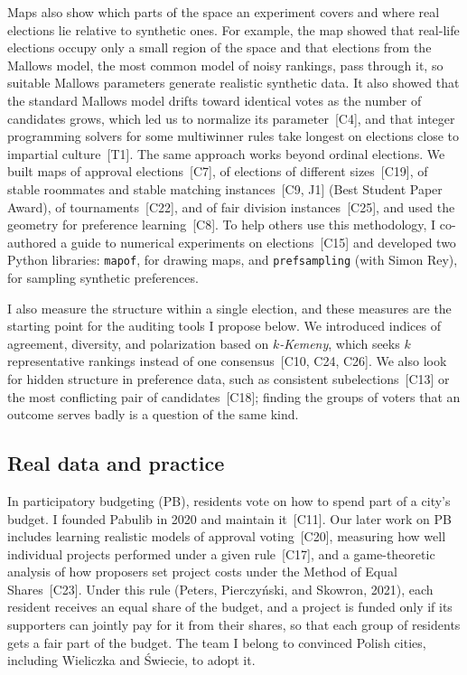 \documentclass[11pt,a4paper]{article}
\newcommand{\pub}[1]{~[#1]}
\begin{document}
Maps also show which parts of the space an experiment covers and where real
elections lie relative to synthetic ones. For example, the map showed that real-life
elections occupy only a small region of the space and that elections from the
Mallows model, the most common model of noisy rankings, pass through it, so
suitable Mallows parameters generate realistic synthetic data. It also showed that the standard Mallows model drifts
toward identical votes as the number of candidates grows, which led us to
normalize its parameter\pub{C4}, and that integer programming solvers for some multiwinner
rules take longest on elections close to impartial culture\pub{T1}.
The same approach works beyond ordinal elections. We built maps of approval
elections\pub{C7}, of elections of different sizes\pub{C19}, of stable
roommates and stable matching instances\pub{C9, J1} (Best Student Paper
Award), of tournaments\pub{C22}, and of fair division instances\pub{C25},
and used the geometry for preference learning\pub{C8}. To help others use
this methodology, I co-authored a guide to numerical experiments on
elections\pub{C15} and developed two Python libraries: \texttt{mapof}, for
drawing maps, and \texttt{prefsampling} (with Simon Rey), for sampling
synthetic preferences.

I also measure the structure within a single election, and these measures are
the starting point for the auditing tools I propose below. We introduced indices of agreement, diversity, and polarization based on
\emph{$k$-Kemeny}, which seeks $k$ representative rankings instead of one
consensus\pub{C10, C24, C26}. We also look for
hidden structure in preference data, such as consistent
subelections\pub{C13} or the most conflicting pair of
candidates\pub{C18}; finding the groups of voters that an outcome serves
badly is a question of the same kind.

\subsection{Real data and practice}
In participatory budgeting (PB), residents vote on how to spend part of a
city's budget. I founded Pabulib in 2020 and maintain it\pub{C11}. Our
later work on PB includes learning realistic models of approval
voting\pub{C20}, measuring how well individual projects performed under
a given rule\pub{C17}, and a game-theoretic analysis of how proposers
set project costs under the Method of Equal Shares\pub{C23}.
Under this rule (Peters, Pierczyński, and Skowron, 2021), each resident
receives an equal share of the budget, and a project is funded only if its
supporters can jointly pay for it from their shares, so that each group of
residents gets a fair part of the budget. The team I belong to convinced
Polish cities, including Wieliczka and \'Swiecie, to adopt it.
\end{document}
